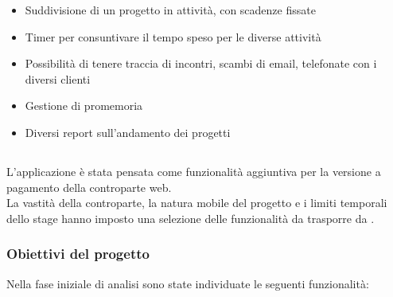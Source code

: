 \begin{itemize}
\item Suddivisione di un progetto in attività, con scadenze fissate
\item Timer per consuntivare il tempo speso per le diverse attività
\item Possibilità di tenere traccia di incontri, scambi di email, telefonate
con i diversi clienti
\item Gestione di promemoria
\item Diversi report sull'andamento dei progetti
\end{itemize}

\subsection{\fiscoloMobile}
L'applicazione è stata pensata come funzionalità aggiuntiva per la versione
a pagamento della controparte web. \\
La vastità della controparte, la natura mobile del progetto e i limiti temporali
dello stage hanno imposto una selezione delle funzionalità da trasporre da
\fiscoloWeb{}.

\subsubsection{Obiettivi del progetto}\label{obiettivi}
Nella fase iniziale di analisi sono state individuate le seguenti funzionalità:

